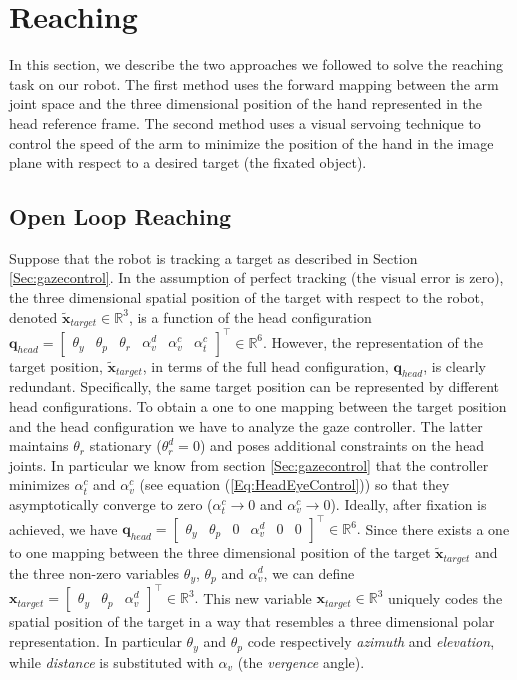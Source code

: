 \section{Reaching}
\label{sec:reaching}

In this section, we describe the two approaches we followed to solve
the reaching task on our robot. The first method 
uses the forward mapping between the arm joint space and the three 
dimensional position of the hand represented in the head reference 
frame. The second method uses a visual servoing technique to control the 
speed of the arm to minimize the position of the hand in the 
image plane with respect to a desired target (the fixated object).

\subsection{Open Loop Reaching} \label{sec:openReaching}
%
Suppose that the robot is tracking a target as described 
in Section \ref{Sec:gazecontrol}. In the assumption of perfect 
tracking (the visual error is zero), the three dimensional spatial position 
of the target with respect to the robot, denoted $\tilde {\mathbf x}_{target} 
\in \mathbb R^3$, 
is a function of the head configuration $\mathbf q_{head} =
\begin{bmatrix} \theta_y & \theta_p & \theta_r & \alpha_v^d & \alpha_v^c & \alpha_t^c \end{bmatrix}^\top \in \mathbb R^6$.
However, the representation of the target position, 
$\tilde {\mathbf x}_{target}$, in terms of the full head configuration, 
$\mathbf q_{head}$, is clearly redundant.
Specifically, the same target position can be represented by different 
head configurations. To obtain a one to one mapping between the target 
position and the head configuration we have to analyze the 
gaze controller. The latter maintains $\theta_r$ stationary 
($\theta_r^d = 0$) and poses additional constraints on the head joints. 
In particular we know from section \ref{Sec:gazecontrol} that the 
controller minimizes $\alpha_t^c$ and $\alpha^c_v$ (see equation 
(\ref{Eq:HeadEyeControl})) so that they asymptotically
converge to zero ($\alpha_t^c \rightarrow 0$ and 
$\alpha_v^c \rightarrow 0$). Ideally, after 
fixation is achieved, we have $
\mathbf {q}_{head}=
\begin{bmatrix} \theta_y & \theta_p & 0 & \alpha_v^d & 0 & 0 \end{bmatrix}^\top \in \mathbb R^6.
$
%
Since there exists a one to one mapping between the three dimensional 
position of the target 
$\tilde {\mathbf x}_{target}$ and the three non-zero variables 
$\theta_y$, $\theta_p$ and $\alpha_v^d$, we can define $
\mathbf x_{target}=
\begin{bmatrix} \theta_y & \theta_p & \alpha_v^d\end{bmatrix}^\top \in \mathbb R^3.
$
%
This new variable $\mathbf x_{target} \in \mathbb R^3$ uniquely codes the 
spatial position of the target in a way that resembles a three dimensional 
polar representation. In particular $\theta_y$ and $\theta_p$ code 
respectively \emph{azimuth} and \emph{elevation}, while \emph{distance} is 
substituted with $\alpha_v$ (the \emph{vergence} angle). 


